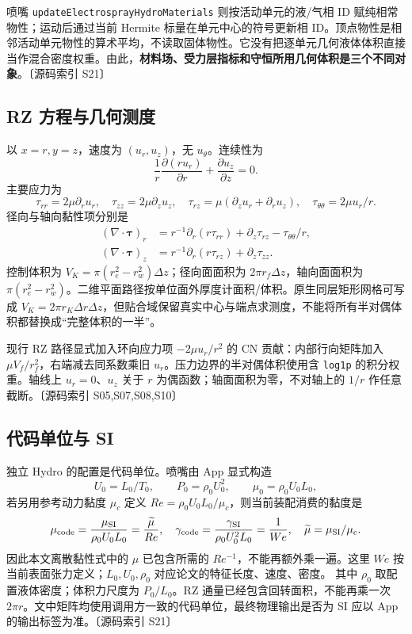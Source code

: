 \documentclass[UTF8,a4paper,11pt,fontset=fandol]{ctexart}
\newcommand{\code}[1]{\nolinkurl{#1}}
\newcommand{\src}[1]{\textcolor{ink}{\small〔源码索引 #1〕}}
\begin{document}
喷嘴 \code{updateElectrosprayHydroMaterials} 则按活动单元的液/气相 ID 赋纯相常物性；运动后通过当前 Hermite 标量在单元中心的符号更新相 ID。顶点物性是相邻活动单元物性的算术平均，不读取固体物性。它没有把逐单元几何液体体积直接当作混合密度权重。由此，\textbf{材料场、受力层指标和守恒所用几何体积是三个不同对象}。\src{S21}

\subsection{RZ 方程与几何测度}
以 $x=r,y=z$，速度为 $(u_r,u_z)$，无 $u_\theta$。连续性为
\begin{equation}
 \frac{1}{r}\frac{\partial (r u_r)}{\partial r}+\frac{\partial u_z}{\partial z}=0.
\end{equation}
主要应力为
\begin{equation}
 \tau_{rr}=2\mu\partial_r u_r,\quad
 \tau_{zz}=2\mu\partial_z u_z,\quad
 \tau_{rz}=\mu(\partial_z u_r+\partial_r u_z),\quad
 \tau_{\theta\theta}=2\mu u_r/r.
\end{equation}
径向与轴向黏性项分别是
\begin{align}
 (\nabla\cdot\bm\tau)_r
 &=r^{-1}\partial_r(r\tau_{rr})+\partial_z\tau_{rz}-\tau_{\theta\theta}/r,\\
 (\nabla\cdot\bm\tau)_z
 &=r^{-1}\partial_r(r\tau_{rz})+\partial_z\tau_{zz}.
\end{align}
控制体积为 $V_K=\pi(r_e^2-r_w^2)\Delta z$；径向面面积为 $2\pi r_f\Delta z$，轴向面面积为 $\pi(r_e^2-r_w^2)$。二维平面路径按单位面外厚度计面积/体积。原生同层矩形网格可写成 $V_K=2\pi r_K\Delta r\Delta z$，但贴合域保留真实中心与端点求测度，不能将所有半对偶体积都替换成“完整体积的一半”。

现行 RZ 路径显式加入环向应力项 $-2\mu u_r/r^2$ 的 CN 贡献：内部行向矩阵加入 $\mu V_f/r_f^2$，右端减去同系数乘旧 $u_r$。压力边界的半对偶体积使用含 \code{log1p} 的积分权重。轴线上 $u_r=0$、$u_z$ 关于 $r$ 为偶函数；轴面面积为零，不对轴上的 $1/r$ 作任意截断。\src{S05,S07,S08,S10}

\subsection{代码单位与 SI}
独立 Hydro 的配置是代码单位。喷嘴由 App 显式构造
\begin{equation}
 U_0=L_0/T_0,\qquad P_0=\rho_0U_0^2,\qquad
 \mu_0=\rho_0U_0L_0,
\end{equation}
若另用参考动力黏度 $\mu_c$ 定义 $Re=\rho_0U_0L_0/\mu_c$，则当前装配消费的黏度是
\begin{equation}
 \mu_{\rm code}=\frac{\mu_{\rm SI}}{\rho_0U_0L_0}
 =\frac{\widetilde\mu}{Re},\quad
 \gamma_{\rm code}=\frac{\gamma_{\rm SI}}{\rho_0U_0^2L_0}=\frac1{We},\quad
 \widetilde\mu=\mu_{\rm SI}/\mu_c.
\end{equation}
因此本文离散黏性式中的 $\mu$ 已包含所需的 $Re^{-1}$，不能再额外乘一遍。这里 $We$ 按当前表面张力定义；$L_0,U_0,\rho_0$ 对应论文的特征长度、速度、密度。
其中 $\rho_0$ 取配置液体密度；体积力尺度为 $P_0/L_0$。RZ 通量已经包含回转面积，不能再乘一次 $2\pi r$。文中矩阵均使用调用方一致的代码单位，最终物理输出是否为 SI 应以 App 的输出标签为准。\src{S21}
\end{document}
